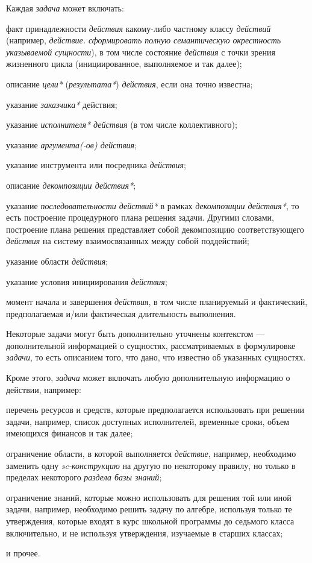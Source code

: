 Каждая \textit{задача} может включать:
\begin{textitemize}
	\item факт принадлежности \textit{действия} какому-либо частному классу \textit{действий} (например,\textit{ действие. сформировать полную семантическую окрестность указываемой сущности}), в том числе состояние \textit{действия} с точки зрения жизненного цикла (инициированное, выполняемое и так далее);
	\item описание \textit{цели*} (\textit{результата*}) \textit{действия}, если она точно известна;
	\item указание \textit{заказчика*} действия;
	\item указание \textit{исполнителя* действия} (в том числе коллективного);
	\item указание \textit{аргумента(-ов) действия\scnrolesign};
	\item указание инструмента или посредника \textit{действия};
	\item описание \textit{декомпозиции действия*};
	\item указание \textit{последовательности действий*} в рамках \textit{декомпозиции действия*}, то есть построение процедурного плана решения задачи. Другими словами, построение плана решения представляет собой декомпозицию соответствующего \textit{действия} на систему взаимосвязанных между собой поддействий;
	\item указание области \textit{действия};
	\item указание условия инициирования \textit{действия};
	\item момент начала и завершения \textit{действия}, в том числе планируемый и фактический, предполагаемая и/или фактическая длительность выполнения.
\end{textitemize}
Некоторые задачи могут быть дополнительно уточнены контекстом --- дополнительной информацией о сущностях, рассматриваемых в формулировке \textit{задачи}, то есть описанием того, что дано, что известно об указанных сущностях.

Кроме этого, \textit{задача} может включать любую дополнительную информацию о действии, например:
\begin{textitemize}
	\item перечень ресурсов и средств, которые предполагается использовать при решении задачи, например, список доступных исполнителей, временные сроки, объем имеющихся финансов и так далее;
	\item ограничение области, в которой выполняется \textit{действие}, например, необходимо заменить одну \textit{sc-конструкцию} на другую по некоторому правилу, но только в пределах некоторого \textit{раздела базы знаний};
	\item ограничение знаний, которые можно использовать для решения той или иной задачи, например, необходимо решить задачу по алгебре, используя только те утверждения, которые входят в курс школьной программы до седьмого класса включительно, и не используя утверждения, изучаемые в старших классах;
	\item и прочее.
\end{textitemize}

